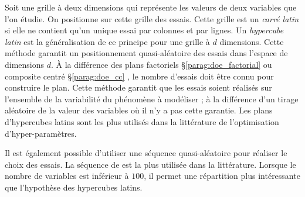 Soit une grille à deux dimensions qui représente les valeurs de deux variables que l'on étudie.
On positionne sur cette grille des essais.
Cette grille est un \textit{carré latin} si elle ne contient qu'un unique essai par colonnes et par lignes.
Un \textit{hypercube latin} est la généralisation de ce principe pour une grille à $d$ dimensions.
Cette méthode garantit un positionnement quasi-aléatoire des essais dans l'espace de dimensions $d$.
À la différence des plans factoriels §\ref{parag:doe_factorial} ou composite centré §\ref{parag:doe_cc} , le nombre d'essais doit être connu pour construire le plan.
Cette méthode garantit que les essais soient réalisés sur l'ensemble de la variabilité du phénomène à modéliser ; à la différence d'un tirage aléatoire de la valeur des variables où il n'y a pas cette garantie.
Les plans d'hypercubes latins sont les plus utilisés dans la littérature de l'optimisation d'hyper-paramètres.

Il est également possible d'utiliser une séquence quasi-aléatoire pour réaliser le choix des essais.
La séquence de \citeauthor{sobol_distribution_1967} \cite{sobol_distribution_1967} est la plus utilisée dans la littérature.
Lorsque le nombre de variables est inférieur à $100$, il permet une répartition plus intéressante que l'hypothèse des hypercubes latins.

